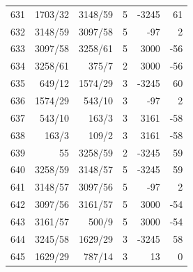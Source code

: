 \documentclass[11pt,a4paper]{article}
\begin{document}
\begin{minipage}[t]{.49\linewidth}
\begin{tabular*}{\linewidth}{@{}r@{\extracolsep{\fill}}rrrrr@{}}
631 & 1703/32 & 3148/59 & 5 & -3245 & 61\\
632 & 3148/59 & 3097/58 & 5 & -97 & 2\\
633 & 3097/58 & 3258/61 & 5 & 3000 & -56\\
634 & 3258/61 & 375/7 & 2 & 3000 & -56\\
635 & 649/12 & 1574/29 & 3 & -3245 & 60\\
636 & 1574/29 & 543/10 & 3 & -97 & 2\\
637 & 543/10 & 163/3 & 3 & 3161 & -58\\
638 & 163/3 & 109/2 & 3 & 3161 & -58\\
639 & 55 & 3258/59 & 2 & -3245 & 59\\
640 & 3258/59 & 3148/57 & 5 & -3245 & 59\\
641 & 3148/57 & 3097/56 & 5 & -97 & 2\\
642 & 3097/56 & 3161/57 & 5 & 3000 & -54\\
643 & 3161/57 & 500/9 & 5 & 3000 & -54\\
644 & 3245/58 & 1629/29 & 3 & -3245 & 58\\
645 & 1629/29 & 787/14 & 3 & 13 & 0\\
\bottomrule\end{tabular*}\end{minipage}\hfill
\end{document}
